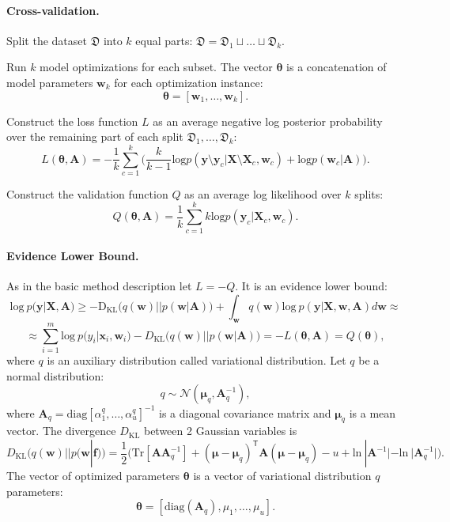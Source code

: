 \documentclass[12pt]{article}
\begin{document}
\paragraph{Cross-validation.}
Split the dataset  $\mathfrak{D}$ into $k$ equal parts:
$
\mathfrak{D} = \mathfrak{D}_1 \sqcup \dots \sqcup \mathfrak{D}_k.
$


Run $k$ model optimizations for each subset. The vector $\boldsymbol{\theta}$ is a concatenation of model parameters $\mathbf{w}_k$ for each optimization instance:
\[
\boldsymbol{\theta} = [\mathbf{w}_1, \dots, \mathbf{w}_k].
\]
 
Construct the loss function $L$ as an average negative log posterior probability over the remaining part of each split $\mathfrak{D}_1, \dots, \mathfrak{D}_k$:  
\begin{equation}
\label{eq:cv}
L(\boldsymbol{\theta}, \mathbf{A}) = -\frac{1}{k}\sum_{c=1}^k \bigl(\frac{k}{k-1}\text{log}p(\mathbf{y} \setminus \mathbf{y}_c|\mathbf{X}\setminus \mathbf{X}_c, \mathbf{w}_c) + \text{log}p(\mathbf{w}_c|\mathbf{A})\bigr).
\end{equation}

Construct the validation function $Q$ as an average log likelihood over $k$ splits:
\[
Q(\boldsymbol{\theta}, \mathbf{A}) = \frac{1}{k}\sum_{c=1}^k k\text{log}p(\mathbf{y}_c|\mathbf{X}_c, \mathbf{w}_c).
\]

\paragraph{Evidence Lower Bound.}
As in the basic method description let $L=-Q$. It is an evidence lower bound:
\begin{equation} 
\label{eq:elbo}
\text{log}~p(\mathbf{y}|\mathbf{X},\mathbf{A})  
\geq 
-\text{D}_\text{KL} \bigl(q(\mathbf{w})||p(\mathbf{w}|\mathbf{A})\bigr) + \int_{\mathbf{w}} q(\mathbf{w})\text{log}~{p(\mathbf{y}|\mathbf{X},\mathbf{w},\mathbf{A})} d \mathbf{w}  \approx
\end{equation}
\[
\approx \sum_{i=1}^m \text{log}~p({y}_i|\mathbf{x}_i, \mathbf{w}_i) - D_\text{KL}\bigl(q (\mathbf{w}) || p (\mathbf{w}|\mathbf{A})\bigr) = -L(\boldsymbol{\theta}, \mathbf{A}) = Q(\boldsymbol{\theta}),
\]
where $q$ is an auxiliary distribution called variational distribution. Let $q$ be a normal distribution:
\begin{equation}
\label{eq:diag}
	q \sim \mathcal{N}(\boldsymbol{\mu}_q, \mathbf{A}^{-1}_q),
\end{equation}
where $\mathbf{A}_q = \text{diag}[\alpha^q_1, \dots, \alpha^q_u]^{-1}$ is  a diagonal covariance matrix and $\boldsymbol{\mu}_q$ is a mean vector.
The divergence $D_\text{KL}$ between 2 Gaussian variables is 
\[
	D_\text{KL}\bigl(q (\mathbf{w}) || p (\mathbf{w}|\mathbf{f})\bigr) = \frac{1}{2} \bigl( \text{Tr} [\mathbf{A}\mathbf{A}^{-1}_q] + (\boldsymbol{\mu} - \boldsymbol{\mu}_q)^\mathsf{T}\mathbf{A}(\boldsymbol{\mu} - \boldsymbol{\mu}_q) - u +\text{ln}~|\mathbf{A}^{-1}| - \text{ln}~|\mathbf{A}_q^{-1}| \bigr).
\]
The vector of optimized parameters $\boldsymbol{\theta}$ is a vector of variational distribution $q$ parameters:
\[
\boldsymbol{\theta} = [\text{diag}(\mathbf{A}_q), {\mu}_1,\dots,{\mu}_u].
\]
\end{document}
